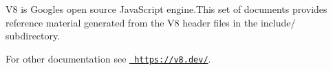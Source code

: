 V8 is Google\textquotesingle{}s open source Java\+Script engine.\+This set of documents provides reference material generated from the V8 header files in the include/ subdirectory.

For other documentation see \href{https://v8.dev/}{\texttt{ https\+://v8.\+dev/}}. 